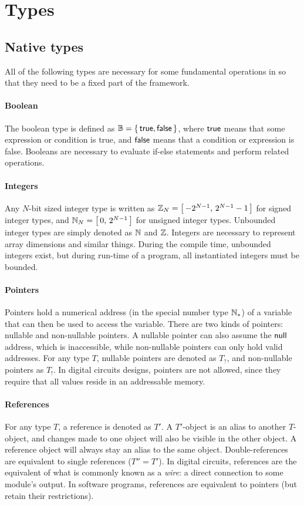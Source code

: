 \section{Types}

\subsection{Native types}
All of the following types are necessary for some fundamental operations in {\tetra} so that they need to be a fixed part of the framework.

\paragraph{Boolean}
The boolean type is defined as $\mathbb{B} = \left\{\,\mathsf{true}, \mathsf{false}\,\right\}$, where $\mathsf{true}$ means that some expression or condition is true, and $\mathsf{false}$ means that a condition or expression is false.
Booleans are necessary to evaluate if-else statements and perform related operations.

\paragraph{Integers}
Any $N$-bit sized integer type is written as $\mathbb{Z}_N = \left[\,-2^{N-1},\, 2^{N-1}-1\,\right]$ for signed integer types, and $\mathbb{N}_N = \left[\,0,\,2^{N-1}\,\right]$ for unsigned integer types.
Unbounded integer types are simply denoted as $\mathbb{N}$ and $\mathbb{Z}$.
Integers are necessary to represent array dimensions and similar things.
During the compile time, unbounded integers exist, but during run-time of a program, all instantiated integers must be bounded.

\paragraph{Pointers}
Pointers hold a numerical address (in the special number type $\mathbb{N}_*$) of a variable that can then be used to access the variable.
There are two kinds of pointers: nullable and non-nullable pointers.
A nullable pointer can also assume the $\mathsf{null}$ address, which is inaccessible, while non-nullable pointers can only hold valid addresses.
For any type $T$, nullable pointers are denoted as $T_?$, and non-nullable pointers as $T_!$.
In digital circuits designs, pointers are not allowed, since they require that all values reside in an addressable memory.

\paragraph{References}
For any type $T$, a reference is denoted as $T'$.
A $T'$-object is an alias to another $T$-object, and changes made to one object will also be visible in the other object.
A reference object will always stay an alias to the same object.
Double-references are equivalent to single references ($T''=T'$).
In digital circuits, references are the equivalent of what is commonly known as a \emph{wire}: a direct connection to some module's output.
In software programs, references are equivalent to pointers (but retain their restrictions).

